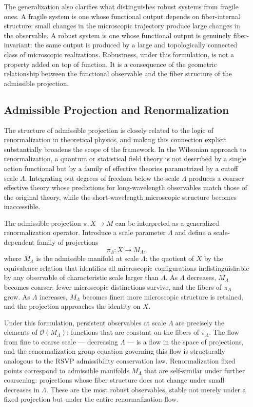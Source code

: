 \documentclass[12pt, a4paper]{article}
\theoremstyle{essaystyle}
\begin{document}
The generalization also clarifies what distinguishes robust systems from fragile ones.
A fragile system is one whose functional output depends on fiber-internal structure:
small changes in the microscopic trajectory produce large changes in the observable.
A robust system is one whose functional output is genuinely fiber-invariant: the same
output is produced by a large and topologically connected class of microscopic
realizations. Robustness, under this formulation, is not a property added on top of
function. It is a consequence of the geometric relationship between the functional
observable and the fiber structure of the admissible projection.

\subsection{Admissible Projection and Renormalization}

The structure of admissible projection is closely related to the logic of renormalization
in theoretical physics, and making this connection explicit substantially broadens the
scope of the framework. In the Wilsonian approach to renormalization, a quantum or
statistical field theory is not described by a single action functional but by a family
of effective theories parametrized by a cutoff scale $\Lambda$. Integrating out degrees
of freedom below the scale $\Lambda$ produces a coarser effective theory whose
predictions for long-wavelength observables match those of the original theory,
while the short-wavelength microscopic structure becomes inaccessible.

The admissible projection $\pi : X \to M$ can be interpreted as a generalized
renormalization operator. Introduce a scale parameter $\Lambda$ and define a
scale-dependent family of projections
\[
\pi_\Lambda : X \longrightarrow M_\Lambda,
\]
where $M_\Lambda$ is the admissible manifold at scale $\Lambda$: the quotient of $X$
by the equivalence relation that identifies all microscopic configurations
indistinguishable by any observable of characteristic scale larger than $\Lambda$.
As $\Lambda$ decreases, $M_\Lambda$ becomes coarser: fewer microscopic distinctions
survive, and the fibers of $\pi_\Lambda$ grow. As $\Lambda$ increases, $M_\Lambda$
becomes finer: more microscopic structure is retained, and the projection approaches
the identity on $X$.

Under this formulation, persistent observables at scale $\Lambda$ are precisely the
elements of $\mathcal{O}(M_\Lambda)$: functions that are constant on the fibers of
$\pi_\Lambda$. The flow from fine to coarse scale --- decreasing $\Lambda$ --- is a
flow in the space of projections, and the renormalization group equation governing this
flow is structurally analogous to the RSVP admissibility conservation law. Renormalization
fixed points correspond to admissible manifolds $M_\Lambda$ that are self-similar
under further coarsening: projections whose fiber structure does not change under
small decreases in $\Lambda$. These are the most robust observables, stable not merely
under a fixed projection but under the entire renormalization flow.
\end{document}
